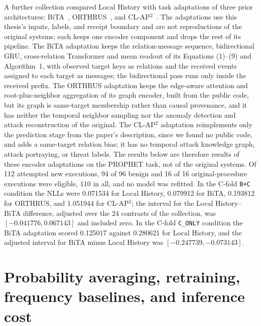 A further collection compared Local History with task adaptations of
three prior architectures: BiTA~\cite{nayeri2026bita},
ORTHRUS~\cite{jiang2025orthrus}, and CL-AP$^2$~\cite{liu2024clap2}.
The
adaptations use this thesis's inputs, labels, and receipt boundary and
are not reproductions of the original systems; each keeps one encoder
component and drops the rest of its pipeline. The BiTA adaptation keeps
the relation-message sequence, bidirectional GRU, cross-relation
Transformer and mean readout of its Equations (1)--(9) and Algorithm~1,
with observed target keys as relations and the received events assigned
to each target as messages; the bidirectional pass runs only inside the
received prefix. The ORTHRUS adaptation keeps the edge-aware attention
and root-plus-neighbor aggregation of its graph encoder, built from the
public code, but its graph is same-target membership rather than causal
provenance, and it has neither the temporal neighbor sampling nor the
anomaly detection and attack reconstruction of the original. The
CL-AP$^2$ adaptation reimplements only the prediction stage from the
paper's description, since we found no public code, and adds a
same-target relation bias; it has no temporal attack knowledge graph,
attack portraying, or threat labels. The results below are therefore
results of these encoder adaptations on the PROPHET task, not of the
original systems. Of 112 attempted new
executions, 94 of 96 benign and 16 of 16 original-procedure executions
were eligible, 110 in all, and no model was refitted. In the C-fold
\texttt{B+C} condition the NLLs were 0.071534 for Local History,
0.079912 for BiTA, 0.193812 for ORTHRUS, and 1.051944 for CL-AP$^2$; the
interval for the Local History--BiTA difference, adjusted over the 24
contrasts of the collection, was $[-0.041776, 0.067143]$ and included
zero. In the C-fold \texttt{C\_ONLY} condition the BiTA adaptation scored
0.125017 against 0.280621 for Local History, and the adjusted interval
for BiTA minus Local History was $[-0.247739,-0.073143]$.

\section{Probability averaging, retraining, frequency baselines, and inference cost}
\label{sec:app-mix}

